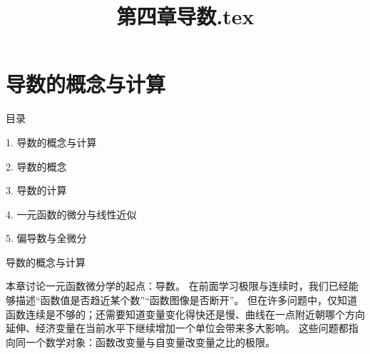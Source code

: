 \documentclass[aspectratio=169,10pt,fontset=fandol]{ctexbeamer}
\title{第四章导数.tex}
\begin{document}
\section{导数的概念与计算}
\begin{frame}[t,fragile]{目录}
\normalsize
{\color{blue}\normalsize 1. 导数的概念与计算\par}\vspace{0.22em}
{\color{gray!40}\normalsize 2. 导数的概念\par}\vspace{0.22em}
{\color{gray!40}\normalsize 3. 导数的计算\par}\vspace{0.22em}
{\color{gray!40}\normalsize 4. 一元函数的微分与线性近似\par}\vspace{0.22em}
{\color{gray!40}\normalsize 5. 偏导数与全微分\par}\vspace{0.22em}
\end{frame}
\begin{frame}[t,fragile]{导数的概念与计算}
\normalsize
{\normalsize
本章讨论一元函数微分学的起点：导数。 在前面学习极限与连续时，我们已经能够描述“函数值是否趋近某个数”“函数图像是否断开”。 但在许多问题中，仅知道函数连续是不够的；还需要知道变量变化得快还是慢、曲线在一点附近朝哪个方向延伸、经济变量在当前水平下继续增加一个单位会带来多大影响。 这些问题都指向同一个数学对象：函数改变量与自变量改变量之比的极限。


}
\end{frame}
\end{document}
